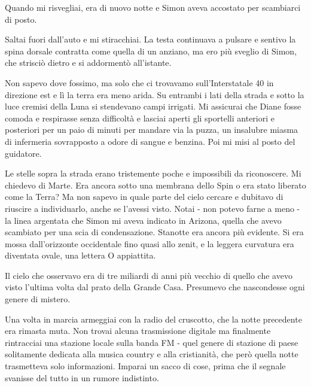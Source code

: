 \separatorefiori

Quando mi risvegliai, era di nuovo notte e Simon aveva accostato per
scambiarci di posto.

Saltai fuori dall'auto e mi stiracchiai. La testa continuava a pulsare e
sentivo la spina dorsale contratta come quella di un anziano, ma ero più
sveglio di Simon, che strisciò dietro e si addormentò all'istante.

Non sapevo dove fossimo, ma solo che ci trovavamo sull'Interstatale 40
in direzione est e lì la terra era meno arida. Su entrambi i lati della
strada e sotto la luce cremisi della Luna si stendevano campi irrigati.
Mi assicurai che Diane fosse comoda e respirasse senza difficoltà e
lasciai aperti gli sportelli anteriori e posteriori per un paio di
minuti per mandare via la puzza, un insalubre miasma di infermeria
sovrapposto a odore di sangue e benzina. Poi mi misi al posto del
guidatore.

Le stelle sopra la strada erano tristemente poche e impossibili da
riconoscere. Mi chiedevo di Marte. Era ancora sotto una membrana dello
Spin o era stato liberato come la Terra? Ma non sapevo in quale parte
del cielo cercare e dubitavo di riuscire a individuarlo, anche se
l'avessi visto. Notai - non potevo farne a meno - la linea argentata che
Simon mi aveva indicato in Arizona, quella che avevo scambiato per una
scia di condensazione. Stanotte era ancora più evidente. Si era mossa
dall'orizzonte occidentale fino quasi allo zenit, e la leggera curvatura
era diventata ovale, una lettera O appiattita.

Il cielo che osservavo era di tre miliardi di anni più vecchio di quello
che avevo visto l'ultima volta dal prato della Grande Casa. Presumevo
che nascondesse ogni genere di mistero.

Una volta in marcia armeggiai con la radio del cruscotto, che la notte
precedente era rimasta muta. Non trovai alcuna trasmissione digitale ma
finalmente rintracciai una stazione locale sulla banda FM - quel genere
di stazione di paese solitamente dedicata alla musica country e alla
cristianità, che però quella notte trasmetteva solo informazioni.
Imparai un sacco di cose, prima che il segnale svanisse del tutto in un
rumore indistinto.

